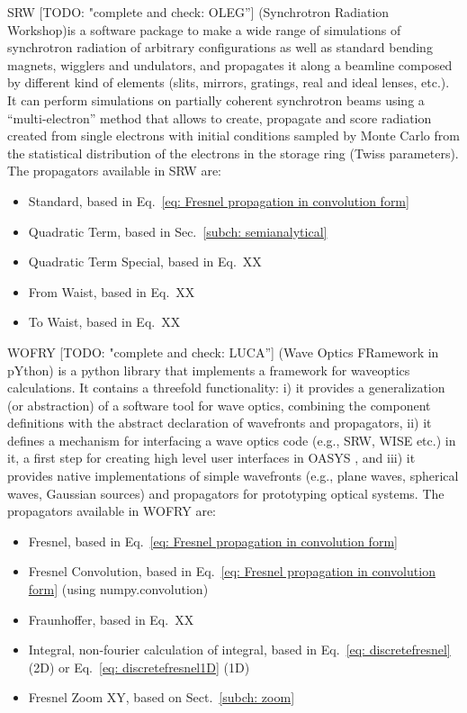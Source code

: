 \documentclass{iucr}              %
\newcommand{\todo}[1]{{\color{red}[TODO: "#1'']}}
\newcommand{\inred}[1]{{\color{red}#1}}
\begin{document}
SRW \todo{complete and check: OLEG} \cite{Chubar1998} (Synchrotron Radiation Workshop)is a software package to make a wide range of simulations of synchrotron radiation of arbitrary configurations as well as standard bending magnets, wigglers and undulators, and propagates it along a beamline composed by different kind of elements (slits, mirrors, gratings, real and ideal lenses, etc.). It can perform simulations on partially coherent synchrotron beams using a ``multi-electron'' method that allows to create, propagate and score radiation created from single electrons with initial conditions sampled by Monte Carlo from the statistical distribution of the electrons in the storage ring (Twiss parameters). The propagators available in SRW are: 
\begin{itemize}
    \item Standard, based in Eq.~\ref{eq: Fresnel propagation in convolution form}
    \item Quadratic Term, based in Sec.~\ref{subch: semianalytical}
    \item Quadratic Term Special, based in Eq.~XX
    \item From Waist, based in Eq.~XX
    \item To Waist, based in Eq.~XX
\end{itemize}

WOFRY \todo{complete and check: LUCA} \cite{Wofrygit} (Wave Optics FRamework in pYthon) is a python library that implements a framework for waveoptics calculations. It contains a threefold functionality: i) it provides a generalization (or abstraction) of a software tool for wave optics, combining the component definitions with the abstract declaration of wavefronts and propagators, ii) it defines a mechanism for interfacing a wave optics code (e.g., SRW, WISE etc.) in it, a first step for creating high level user interfaces in OASYS \cite{oasys}, and iii) it provides native implementations of simple wavefronts (e.g., plane waves, spherical waves, Gaussian sources) and propagators for prototyping optical systems.
The propagators available in WOFRY are: 
\begin{itemize}
    \item Fresnel, based in Eq.~\ref{eq: Fresnel propagation in convolution form}
    \item Fresnel Convolution, based in Eq.~\ref{eq: Fresnel propagation in convolution form} \inred{(using numpy.convolution)}
    \item Fraunhoffer, based in Eq.~XX
    \item Integral, non-fourier calculation of integral, based in Eq.~\ref{eq: discretefresnel} (2D) or Eq.~\ref{eq: discretefresnel1D} (1D)
    \item Fresnel Zoom XY, based on Sect.~\ref{subch: zoom}
\end{itemize}
\end{document}
